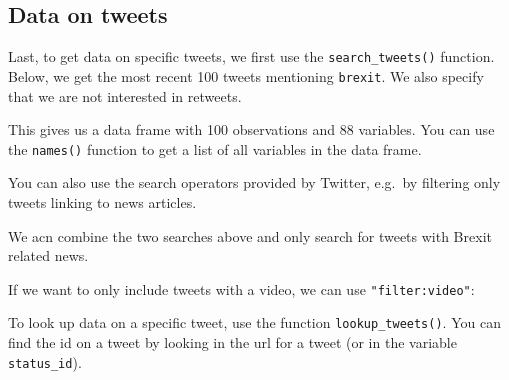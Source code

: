 \documentclass[12pt,oneside]{reedthesis}
\theoremstyle{definition}
\theoremstyle{definition}
\theoremstyle{definition}
\theoremstyle{remark}
\begin{document}
  \subsection{Data on tweets}\label{data-on-tweets}
  
  Last, to get data on specific tweets, we first use the
  \texttt{search\_tweets()} function. Below, we get the most recent 100
  tweets mentioning \texttt{brexit}. We also specify that we are not
  interested in retweets.
  \begin{Shaded}
  \begin{Highlighting}[]
  \StringTok{ }\NormalTok{(}
    \NormalTok{, } \NormalTok{, } 
  \NormalTok{)}
  \end{Highlighting}
  \end{Shaded}
  This gives us a data frame with 100 observations and 88 variables. You
  can use the \texttt{names()} function to get a list of all variables in
  the data frame.
  
  You can also use the search operators provided by Twitter, e.g.~by
  filtering only tweets linking to news articles.
  \begin{Shaded}
  \begin{Highlighting}[]
  \StringTok{ }\NormalTok{(}\NormalTok{, } \NormalTok{)}
  \end{Highlighting}
  \end{Shaded}
  We acn combine the two searches above and only search for tweets with
  Brexit related news.
  \begin{Shaded}
  \begin{Highlighting}[]
  \StringTok{ }\NormalTok{(}\NormalTok{, } \NormalTok{, } \NormalTok{)}
  \end{Highlighting}
  \end{Shaded}
  If we want to only include tweets with a video, we can use
  \texttt{"filter:video"}:
  \begin{Shaded}
  \begin{Highlighting}[]
  \StringTok{ }\NormalTok{(}\NormalTok{, } \NormalTok{, } \NormalTok{)}
  \end{Highlighting}
  \end{Shaded}
  To look up data on a specific tweet, use the function
  \texttt{lookup\_tweets()}. You can find the id on a tweet by looking in
  the url for a tweet (or in the variable \texttt{status\_id}).
  \begin{Shaded}
  \begin{Highlighting}[]
  \NormalTok{(}\NormalTok{)}
  \end{Highlighting}
  \end{Shaded}
\end{document}
